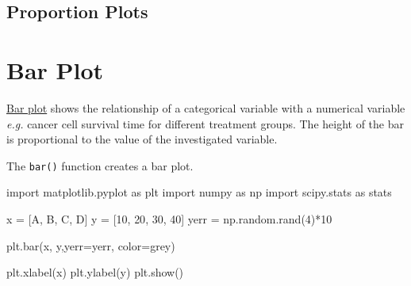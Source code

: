 \documentclass[
  letterpaper,
  DIV=11,
  numbers=noendperiod]{scrreprt}
\newenvironment{Shaded}{\begin{snugshade}}{\end{snugshade}}
\newcommand{\DecValTok}[1]{\textcolor[rgb]{0.68,0.00,0.00}{#1}}
\newcommand{\ImportTok}[1]{\textcolor[rgb]{0.00,0.46,0.62}{#1}}
\newcommand{\NormalTok}[1]{\textcolor[rgb]{0.00,0.23,0.31}{#1}}
\newcommand{\OperatorTok}[1]{\textcolor[rgb]{0.37,0.37,0.37}{#1}}
\newcommand{\StringTok}[1]{\textcolor[rgb]{0.13,0.47,0.30}{#1}}
\begin{document}
\subsection*{Proportion Plots}\label{proportion-plots}

\section*{Bar Plot}\label{bar-plot}


\href{https://matplotlib.org/stable/api/_as_gen/matplotlib.pyplot.bar.html}{Bar
plot} shows the relationship of a categorical variable with a numerical
variable \emph{e.g.} cancer cell survival time for different treatment
groups. The height of the bar is proportional to the value of the
investigated variable.

The \texttt{bar()} function creates a bar plot.

\begin{Shaded}
\begin{Highlighting}[]
\ImportTok{import}\NormalTok{ matplotlib.pyplot }\ImportTok{as}\NormalTok{ plt}
\ImportTok{import}\NormalTok{ numpy }\ImportTok{as}\NormalTok{ np}
\ImportTok{import}\NormalTok{ scipy.stats }\ImportTok{as}\NormalTok{ stats}

\NormalTok{x }\OperatorTok{=}\NormalTok{ [}\StringTok{\textquotesingle{}A\textquotesingle{}}\NormalTok{, }\StringTok{\textquotesingle{}B\textquotesingle{}}\NormalTok{, }\StringTok{\textquotesingle{}C\textquotesingle{}}\NormalTok{, }\StringTok{\textquotesingle{}D\textquotesingle{}}\NormalTok{]}
\NormalTok{y }\OperatorTok{=}\NormalTok{ [}\DecValTok{10}\NormalTok{, }\DecValTok{20}\NormalTok{, }\DecValTok{30}\NormalTok{, }\DecValTok{40}\NormalTok{]}
\NormalTok{yerr }\OperatorTok{=}\NormalTok{ np.random.rand(}\DecValTok{4}\NormalTok{)}\OperatorTok{*}\DecValTok{10}

\NormalTok{plt.bar(x, y,yerr}\OperatorTok{=}\NormalTok{yerr, color}\OperatorTok{=}\StringTok{\textquotesingle{}grey\textquotesingle{}}\NormalTok{)}

\NormalTok{plt.xlabel(}\StringTok{\textquotesingle{}x\textquotesingle{}}\NormalTok{)}
\NormalTok{plt.ylabel(}\StringTok{\textquotesingle{}y\textquotesingle{}}\NormalTok{)}
\NormalTok{plt.show()}
\end{Highlighting}
\end{Shaded}
\end{document}
